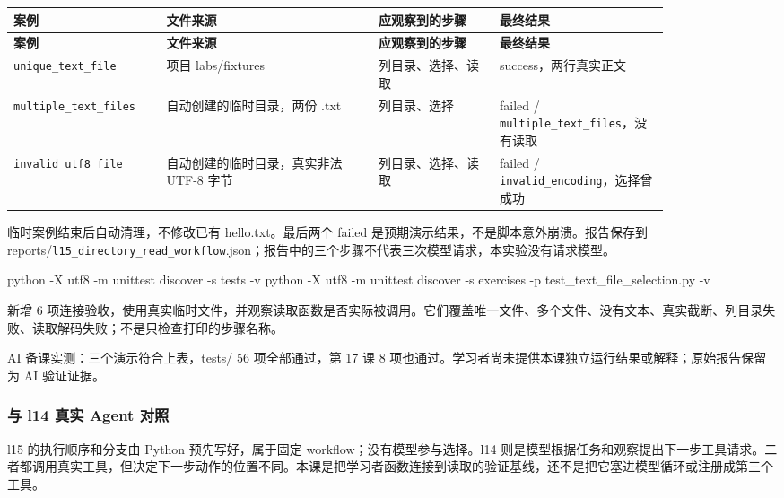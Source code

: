 {\small\setlength{\tabcolsep}{4pt}
\renewcommand{\arraystretch}{1.25}
\begin{longtable}{>{\raggedright\arraybackslash}p{0.18\linewidth}>{\raggedright\arraybackslash}p{0.29\linewidth}>{\raggedright\arraybackslash}p{0.16\linewidth}>{\raggedright\arraybackslash}p{0.22\linewidth}}
\toprule
\textbf{案例} & \textbf{文件来源} & \textbf{应观察到的步骤} & \textbf{最终结果} \\
\midrule\endfirsthead
\toprule
\textbf{案例} & \textbf{文件来源} & \textbf{应观察到的步骤} & \textbf{最终结果} \\
\midrule\endhead
\bottomrule\endfoot
\nolinkurl{unique_text_file} & 项目 labs/fixtures & 列目录、选择、读取 & success，两行真实正文 \\
\nolinkurl{multiple_text_files} & 自动创建的临时目录，两份 .txt & 列目录、选择 & failed / \nolinkurl{multiple_text_files}，没有读取 \\
\nolinkurl{invalid_utf8_file} & 自动创建的临时目录，真实非法 UTF-8 字节 & 列目录、选择、读取 & failed / \nolinkurl{invalid_encoding}，选择曾成功 \\
\end{longtable}}

临时案例结束后自动清理，不修改已有 hello.txt。最后两个 failed 是预期演示结果，不是脚本意外崩溃。报告保存到 reports/\nolinkurl{l15_directory_read_workflow}.json；报告中的三个步骤不代表三次模型请求，本实验没有请求模型。

\begin{Code}
python -X utf8 -m unittest discover -s tests -v
python -X utf8 -m unittest discover -s exercises -p test_text_file_selection.py -v
\end{Code}

新增 6 项连接验收，使用真实临时文件，并观察读取函数是否实际被调用。它们覆盖唯一文件、多个文件、没有文本、真实截断、列目录失败、读取解码失败；不是只检查打印的步骤名称。

AI 备课实测：三个演示符合上表，tests/ 56 项全部通过，第 17 课 8 项也通过。学习者尚未提供本课独立运行结果或解释；原始报告保留为 AI 验证证据。

\subsubsection{与 l14 真实 Agent 对照}

l15 的执行顺序和分支由 Python 预先写好，属于固定 workflow；没有模型参与选择。l14 则是模型根据任务和观察提出下一步工具请求。二者都调用真实工具，但决定下一步动作的位置不同。本课是把学习者函数连接到读取的验证基线，还不是把它塞进模型循环或注册成第三个工具。

